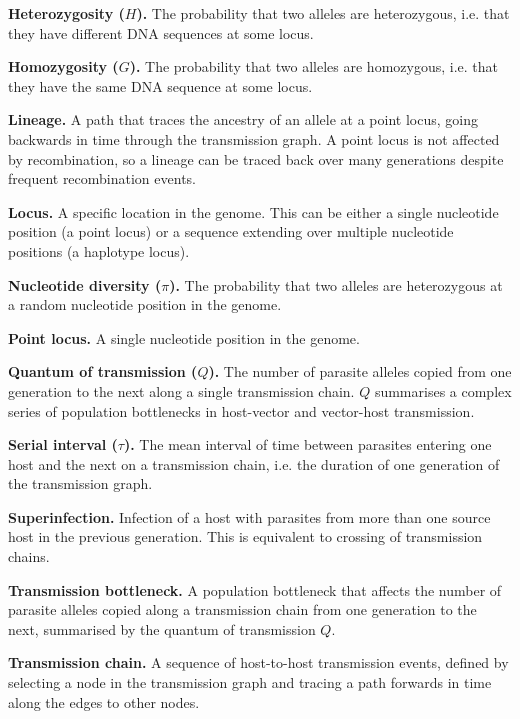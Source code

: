 \documentclass[_main.tex]{subfiles}
\begin{document}
{{\medskip

\textbf{Heterozygosity ($H$).}  The probability that two alleles are heterozygous, i.e. that they have different DNA sequences at some locus. 

\medskip

\textbf{Homozygosity ($G$).}  The probability that two alleles are homozygous, i.e. that they have the same DNA sequence at some locus.

\medskip

\textbf{Lineage.} A path that traces the ancestry of an allele at a point locus, going backwards in time through the transmission graph.  A point locus is not affected by recombination, so a lineage can be traced back over many generations despite frequent recombination events.

\medskip

\textbf{Locus.}  A specific location in the genome.  This can be either a single nucleotide position (a point locus) or a sequence extending over multiple nucleotide positions (a haplotype locus).

\medskip

\textbf{Nucleotide diversity ($\pi$).}  The probability that two alleles are heterozygous at a random nucleotide position in the genome.

\medskip

\textbf{Point locus.}  A single nucleotide position in the genome. 

\medskip

\textbf{Quantum of transmission ($Q$).} The number of parasite alleles copied from one generation to the next along a single transmission chain.  $Q$ summarises a complex series of population bottlenecks in host-vector and vector-host transmission.

\medskip

\textbf{Serial interval ($\tau$).}  The mean interval of time between parasites entering one host and the next on a transmission chain, i.e. the duration of one generation of the transmission graph.

\medskip

\textbf{Superinfection.}  Infection of a host with parasites from more than one source host in the previous generation.  This is equivalent to crossing of transmission chains.

\medskip

\textbf{Transmission bottleneck.} A population bottleneck that affects the number of parasite alleles copied along a transmission chain from one generation to the next,  summarised by the quantum of transmission $Q$. 

\medskip

\textbf{Transmission chain.}  A sequence of host-to-host transmission events, defined by selecting a node in the transmission graph and tracing a path forwards in time along the edges to other nodes.


    }%
}
\end{document}
